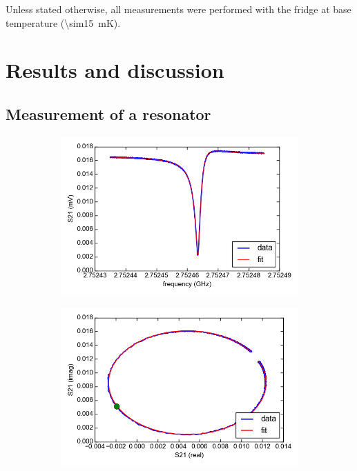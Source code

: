 \documentclass[12pt]{report}
\begin{document}
Unless stated otherwise, all measurements were performed with the fridge at base temperature (\SI{\sim15}{\milli \kelvin}).

\section{Results and discussion}

\subsection{Measurement of a resonator}

\begin{figure}[h]
    \centering
    \begin{subfigure}[b]{.49\textwidth}
        \label{fig:resonator_amplitude}
        \includegraphics[width=\textwidth]{Figures/resonator_amplitude.png}
    \end{subfigure}
    \begin{subfigure}[b]{.49\textwidth}
        \label{fig:resonator_complex}
        \includegraphics[width=\textwidth]{Figures/resonator_complex.png}
    \end{subfigure}
    \label{fig:resonator}
\end{figure}
\end{document}
